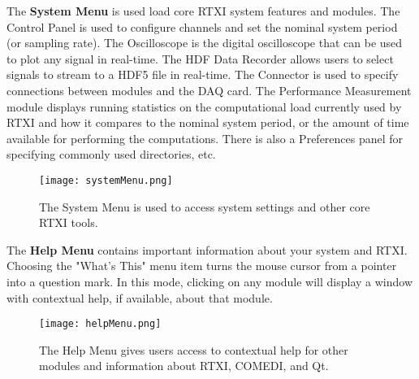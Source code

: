 The \textbf{System Menu} is used load core RTXI system features and modules. The Control Panel is used to configure channels and set the nominal system period (or sampling rate). The Oscilloscope is the digital oscilloscope that can be used to plot any signal in real-time. The HDF Data Recorder allows users to select signals to stream to a HDF5 file in real-time. The Connector is used to specify connections between modules and the DAQ card. The Performance Measurement module displays running statistics on the computational load currently used by RTXI and how it compares to the nominal system period, or the amount of time available for performing the computations. There is also a Preferences panel for specifying commonly used directories, etc.

\begin{figure}[h]
\begin{center}
\texttt{[image: systemMenu.png]} 
\caption[System Menu]{The System Menu is used to access system settings and other core RTXI tools.} 
\end{center}
\end{figure}

The \textbf{Help Menu} contains important information about your system and RTXI. Choosing the "What's This" menu item turns the mouse cursor from a pointer into a question mark. In this mode, clicking on any module will display a window with contextual help, if available, about that module.

\begin{figure}[h]
\begin{center}
\texttt{[image: helpMenu.png]} 
\caption[Help Menu]{The Help Menu gives users access to contextual help for other modules and information about RTXI, COMEDI, and Qt.} 
\end{center}
\end{figure}